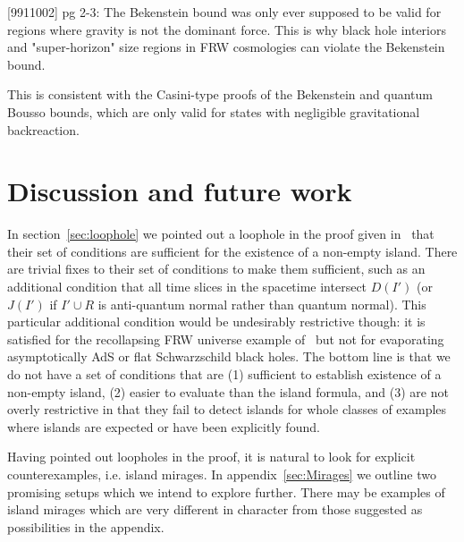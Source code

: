 \documentclass[a4paper,11pt]{article}
\begin{document}
[9911002] pg 2-3: The Bekenstein bound was only ever supposed to be valid for regions where gravity is not the dominant force. This is why black hole interiors and "super-horizon" size regions in FRW cosmologies can violate the Bekenstein bound.

This is consistent with the Casini-type proofs of the Bekenstein and quantum Bousso bounds, which are only valid for states with negligible gravitational backreaction.
\fi


\section{Discussion and future work}\label{sec:Discussion}

In section~\ref{sec:loophole} we pointed out a loophole in the proof given in~\cite{Bousso2021} that their set of conditions are sufficient for the existence of a non-empty island. There are trivial fixes to their set of conditions to make them sufficient, such as an additional condition that all time slices in the spacetime intersect $D(I')$ (or $J(I')$ if $I' \cup R$ is anti-quantum normal rather than quantum normal). This particular additional condition would be undesirably restrictive though: it is satisfied for the recollapsing FRW universe example of~\cite{Hartman2020} but not for evaporating asymptotically AdS or flat Schwarzschild black holes. The bottom line is that we do not have a set of conditions that are (1) sufficient to establish existence of a non-empty island, (2) easier to evaluate than the island formula, and (3) are not overly restrictive in that they fail to detect islands for whole classes of examples where islands are expected or have been explicitly found.

Having pointed out loopholes in the proof, it is natural to look for explicit counterexamples, i.e. island mirages. In appendix~\ref{sec:Mirages} we outline two promising setups which we intend to explore further. There may be examples of island mirages which are very different in character from those suggested as possibilities in the appendix.
\end{document}
